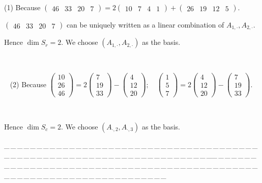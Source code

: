 \documentclass[a4paper, 11pt, UTF8]{article}
\begin{document}
\begin{large}
(1) Because {\small$\begin{pmatrix} 46 & 33 & 20 & 7 \end{pmatrix}=2\begin{pmatrix} 10 & 7 & 4 & 1\end{pmatrix}+\begin{pmatrix} 26 & 19 & 12 & 5\end{pmatrix}$}.\par\qquad
{\small$\begin{pmatrix} 46 & 33 & 20 & 7 \end{pmatrix}$} can be uniquely written as a linear combination of $A_{1,\cdot},A_{2,\cdot}$.\par\qquad
Hence $\dim S_r=2$. We choose $(A_{1,\cdot},A_{2,\cdot})$ as the basis.\par{\tiny\,\par}\,\,\,
(2) Because {\small$\begin{pmatrix} 10\\ 26\\ 46\end{pmatrix}=2\begin{pmatrix} 7\\ 19\\ 33\end{pmatrix}-\begin{pmatrix} 4\\ 12\\ 20\end{pmatrix}; \quad \begin{pmatrix} 1\\ 5\\ 7\end{pmatrix}=2\begin{pmatrix} 4\\ 12\\ 20\end{pmatrix}-\begin{pmatrix} 7\\ 19\\ 33\end{pmatrix}$}.\par{\tiny\,\par}\qquad
Hence $\dim S_c=2.$ We choose $(A_{\cdot,2},A_{\cdot,3})$ as the basis.\par
{\tiny \_\,\_\,\_\,\_\,\_\,\_\,\_\,\_\,\_\,\_\,\_\,\_\,\_\,\_\,\_\,\_\,\_\,\_\,\_\,\_\,\_\,\_\,\_\,\_\,\_\,\_\,\_\,\_\,\_\,\_\,\_\,\_\,\_\,\_\,\_\,\_\,\_\,\_\,\_\,\_\,\_\,\_\,\_\,\_\,\_\,\_\,\_\,\_\,\_\,\_\,\_\,\_\,\_\,\_\,\_\,\_\,\_\,\_\,\_\,\_\,\_\,\_\,\_\,\_\,\_\,\_\,\_\,\_\,\_\,\_\,\_\_\,\_\,\_\,\_\,\_\,\_\,\_\,\_\,\_\,\_\,\_\,\_\,\_\,\_\,\_\,\_\,\_\,\_\,\_\,\_\,\_\,\_\,\_\,\_\,\_\,\_\,\_\,\_\,\_\,\_\,\_\,\_\,\_\,\_\,\_\,\_\,\_\,\_\,\_\,\_\,\_\,\_\,\_\,\_\,\_\,\_\,\_\,\_\,\_\,\_\,\_\,\_\,\_\,\_\,\_\,\_\,\_\,\_\,\_\,\_\,\_\,\_\,\_\,\_\,\_\,\_\,\_\,\_\,\_\,\_\,\_}\par

\end{large}
\end{document}
